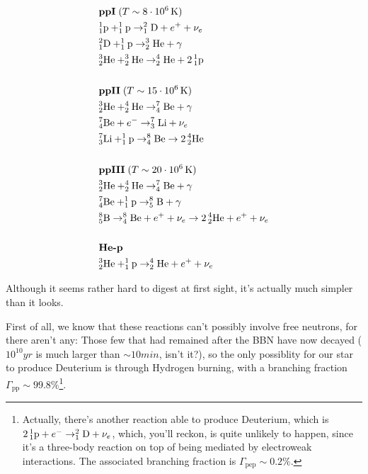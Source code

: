 \begin{align*}
& \text{\textbf{ppI}} \; (T\sim 8\cdot 10^{6}\unit{K})\\
& \element{p}{1}{1}+\element{p}{1}{1}\to \element{D}{2}{1}+e^{+}+\nu_{e}\\
& \element{D}{2}{1}+\element{p}{1}{1}\to \element{He}{3}{2}+\gamma\\
& \element{He}{3}{2}+\element{He}{3}{2}\to \element{He}{4}{2}+2\,\element{p}{1}{1}\\
& \\
& \text{\textbf{ppII}} \; (T\sim 15\cdot 10^{6}\unit{K})\\
& \element{He}{3}{2}+\element{He}{4}{2}\to \element{Be}{7}{4}+\gamma\\
& \element{Be}{7}{4}+e^{-} \to \element{Li}{7}{3}+\nu_{e}\\
& \element{Li}{7}{3}+\element{p}{1}{1}\to \element{Be}{8}{4}\to 2\,\element{He}{4}{2}\\
& \\
& \text{\textbf{ppIII}} \; (T\sim 20\cdot 10^{6}\unit{K})\\
& \element{He}{3}{2}+\element{He}{4}{2}\to \element{Be}{7}{4}+\gamma\\
& \element{Be}{7}{4}+\element{p}{1}{1}\to \element{B}{8}{5}+\gamma\\
& \element{B}{8}{5}\to \element{Be}{8}{4}+e^{+}+\nu_{e}\to 2\,\element{He}{4}{2}+e^{+}+\nu_{e}\\
& \\
& \text{\textbf{He-p}} \; \\
& \element{He}{3}{2}+\element{p}{1}{1}\to \element{He}{4}{2}+e^{+}+\nu_{e}
\end{align*}
\par Although it seems rather hard to digest at first sight, it's actually much simpler than it looks.
\par First of all, we know that these reactions can't possibly involve free neutrons, for there aren't any: Those few that had remained after the BBN have now decayed ($10^{10}\unit{yr}$ is much larger than $\sim 10\unit{min}$, isn't it?), so the only possiblity for our star to produce Deuterium is through Hydrogen burning, with a branching fraction $\Gamma_{\text{pp}}\sim 99.8\%$\footnote{Actually, there's another reaction able to produce Deuterium, which is $2\,\element{p}{1}{1}+e^{-}\to \element{D}{2}{1}+\nu_{e}$, which, you'll reckon, is quite unlikely to happen, since it's a three-body reaction on top of being mediated by electroweak interactions. The associated branching fraction is $\Gamma_{\text{pep}}\sim 0.2\%$.}.
